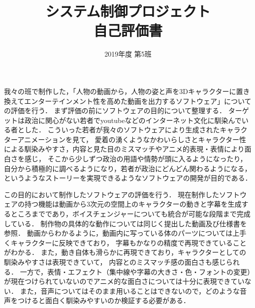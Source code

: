 \documentclass[11pt, a4paper,uplatex]{jsarticle}
\begin{document}
\title{システム制御プロジェクト \\
自己評価書}
\author{2019年度 第5班}
\maketitle

我々の班で制作した，「人物の動画から，人物の姿と声を3Dキャラクターに置き換えてエンターテインメント性を高めた動画を出力するソフトウェア」についての評価を行う．
まず評価の前にソフトウェアの目的について整理する．
ターゲットは政治に関心がない若者でyoutubeなどのインターネット文化に馴染んでいる者とした．
こういった若者が我々のソフトウェアにより生成されたキャラクターアニメーションを見て，
愛着の湧くようなかわいらしさとキャラクター性による馴染みやすさ，内容と見た目のミスマッチやアニメ的表現・表情により面白さを感じ，
そこから少しずつ政治の用語や情勢が頭に入るようになったり，
自分から積極的に調べるようになり，若者が政治にどんどん関わるようになる，
というようなストーリーを実現できるようなソフトウェアの開発が目的である．

この目的において制作したソフトウェアの評価を行う．
現在制作したソフトウェアの持つ機能は動画から3次元の空間上のキャラクターの動きと字幕を生成するところまでであり，ボイスチェンジャーについても統合が可能な段階まで完成している．
制作物の具体的な動作については同じく提出した動画及び仕様書を参照．
動画からわかるように，動画内に写っている体のパーツについては上手くキャラクターに反映できており，
字幕もかなりの精度で再現できていることがわかる．
また，動き自体も滑らかに再現できており，キャラクターとしての馴染みやすさは表現できていて，
内容とのミスマッチ感の面白さも感じられる．
一方で，表情・エフェクト（集中線や字幕の大きさ・色・フォントの変更）が現在つけられていないのでアニメ的な面白さについては十分に表現できていない．
また，音声についてはそのまま用いることはできないので，どのような音声をつけると面白く馴染みやすいのか検証する必要がある．
\end{document}
